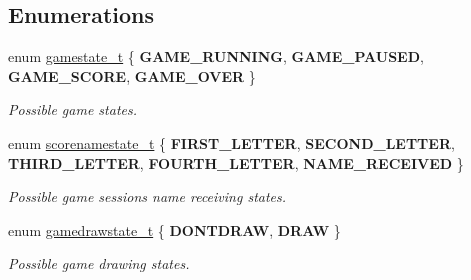 \subsection*{Enumerations}
\begin{DoxyCompactItemize}
\item 
\hypertarget{group__game_gaa3df7fce134ae5843a2bd6cdcd5796d0}{}\label{group__game_gaa3df7fce134ae5843a2bd6cdcd5796d0} 
enum \hyperlink{group__game_gaa3df7fce134ae5843a2bd6cdcd5796d0}{gamestate\+\_\+t} \{ {\bfseries G\+A\+M\+E\+\_\+\+R\+U\+N\+N\+I\+NG}, 
{\bfseries G\+A\+M\+E\+\_\+\+P\+A\+U\+S\+ED}, 
{\bfseries G\+A\+M\+E\+\_\+\+S\+C\+O\+RE}, 
{\bfseries G\+A\+M\+E\+\_\+\+O\+V\+ER}
 \}\begin{DoxyCompactList}\small\item\em Possible game states. \end{DoxyCompactList}
\item 
\hypertarget{group__game_gab8e853703f9cb99b52ba53bcf16b5c4a}{}\label{group__game_gab8e853703f9cb99b52ba53bcf16b5c4a} 
enum \hyperlink{group__game_gab8e853703f9cb99b52ba53bcf16b5c4a}{scorenamestate\+\_\+t} \{ \newline
{\bfseries F\+I\+R\+S\+T\+\_\+\+L\+E\+T\+T\+ER}, 
{\bfseries S\+E\+C\+O\+N\+D\+\_\+\+L\+E\+T\+T\+ER}, 
{\bfseries T\+H\+I\+R\+D\+\_\+\+L\+E\+T\+T\+ER}, 
{\bfseries F\+O\+U\+R\+T\+H\+\_\+\+L\+E\+T\+T\+ER}, 
\newline
{\bfseries N\+A\+M\+E\+\_\+\+R\+E\+C\+E\+I\+V\+ED}
 \}\begin{DoxyCompactList}\small\item\em Possible game session\textquotesingle{}s name receiving states. \end{DoxyCompactList}
\item 
\hypertarget{group__game_ga9984788ca86b30e008e68a755caeb998}{}\label{group__game_ga9984788ca86b30e008e68a755caeb998} 
enum \hyperlink{group__game_ga9984788ca86b30e008e68a755caeb998}{gamedrawstate\+\_\+t} \{ {\bfseries D\+O\+N\+T\+D\+R\+AW}, 
{\bfseries D\+R\+AW}
 \}\begin{DoxyCompactList}\small\item\em Possible game drawing states. \end{DoxyCompactList}
\end{DoxyCompactItemize}
